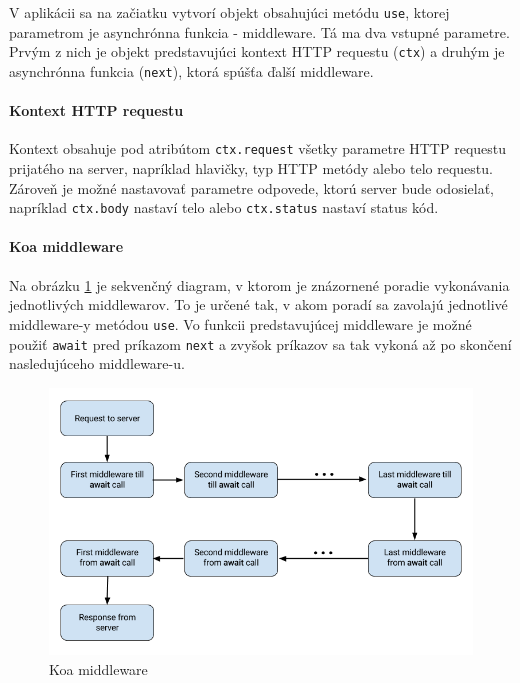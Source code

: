 \documentclass[
  digital, %
  table,   %
  lof,     %
  lot,     %
]{fithesis3}
\begin{document}
V aplikácii sa na začiatku vytvorí objekt obsahujúci metódu \texttt{use}, ktorej parametrom je asynchrónna funkcia - middleware. Tá ma dva vstupné parametre. Prvým z nich je objekt predstavujúci kontext HTTP requestu (\texttt{ctx}) a druhým je asynchrónna funkcia (\texttt{next}), ktorá spúšťa ďalší middleware.

\paragraph{Kontext HTTP requestu}
Kontext obsahuje pod atribútom \texttt{ctx.request} všetky parametre HTTP requestu prijatého na server, napríklad hlavičky, typ HTTP metódy alebo telo requestu. Zároveň je možné nastavovať parametre odpovede, ktorú server bude odosielať, napríklad \texttt{ctx.body} nastaví telo alebo \texttt{ctx.status} nastaví status kód.

\paragraph{Koa middleware}
Na obrázku \ref{fig:koa-middleware} je sekvenčný diagram, v ktorom je znázornené poradie vykonávania jednotlivých middlewarov. To je určené tak, v akom poradí sa zavolajú jednotlivé middleware-y metódou \texttt{use}. Vo funkcii predstavujúcej middleware je možné použiť \texttt{await} pred príkazom 
\texttt{next} a zvyšok príkazov sa tak vykoná až po skončení nasledujúceho middleware-u.


\begin{figure}
	\begin{center}
	\includegraphics[width=\textwidth]{img/koa-middleware.png}
	\end{center}
    \caption{Koa middleware}
	\label{fig:koa-middleware}
\end{figure}
\end{document}
